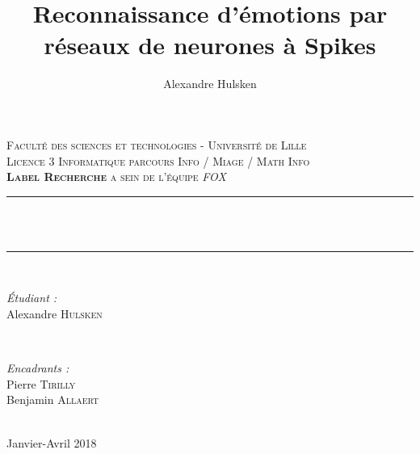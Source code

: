 \documentclass[12pt]{article}
\title{Reconnaissance d'émotions par réseaux de neurones à Spikes}
\author{Alexandre Hulsken}
\makeatletter
\newcommand\licence{Licence 3 Informatique parcours Info / Miage / Math  Info}
\newcommand\univ{Faculté des sciences et technologies - Université de Lille}
\newcommand{\HRule}{\rule{\linewidth}{0.5mm}}
\newcommand\matiere{\textbf{Label Recherche} a sein de l'équipe \textit{FOX}}
\let\thetitle\@title
\makeatother
\begin{document}

\begin{titlepage}
\center

\textsc{\LARGE \univ}\\[1.5cm]
\textsc{\licence}\\[0.5cm]
\textsc{\large \matiere}\\[0.5cm]

\HRule \\[0.4cm]
{ \huge \bfseries \thetitle}\\[0.4cm]
\HRule \\[1.5cm]

\begin{minipage}{0.4\textwidth}
\begin{flushleft} \large
\emph{Étudiant :}\\
Alexandre \textsc{Hulsken}
\end{flushleft}
\end{minipage}
~
\begin{minipage}{0.4\textwidth}
\begin{flushright} \large
\emph{Encadrants :} \\
Pierre \textsc{Tirilly}\\
Benjamin \textsc{Allaert}
\end{flushright}
\end{minipage}\\[1.7cm]

{\large Janvier-Avril 2018}\\[1.5cm]


\end{titlepage}
\end{document}
